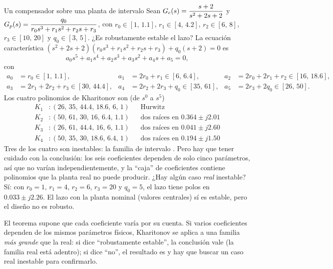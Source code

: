 \begin{ejemplo}[label=ej:es-khar1]{Un compensador sobre una planta de intervalo}
Sean $G_c(s)=\dfrac{s+2}{s^2+2s+2}$ y $G_p(s)=\dfrac{q_0}{r_0s^3+r_1s^2+r_2s+r_3}$, con $r_0\in[1,\,1.1]$, $r_1\in[4,\,4.2]$, $r_2\in[6,\,8]$, $r_3\in[10,\,20]$ y $q_0\in[3,\,5]$. ¿Es robustamente estable el lazo?
\solucion La ecuación característica $(s^2+2s+2)(r_0s^3+r_1s^2+r_2s+r_3)+q_0(s+2)=0$ es
\[
  a_0s^5+a_1s^4+a_2s^3+a_3s^2+a_4s+a_5=0,
\]
con
\[
\begin{aligned}
  a_0&=r_0\in[1,\,1.1], & a_1&=2r_0+r_1\in[6,\,6.4], & a_2&=2r_0+2r_1+r_2\in[16,\,18.6],\\
  a_3&=2r_1+2r_2+r_3\in[30,\,44.4], & a_4&=2r_2+2r_3+q_0\in[35,\,61], & a_5&=2r_3+2q_0\in[26,\,50].
\end{aligned}
\]
Los cuatro polinomios de Kharitonov son (de $s^0$ a $s^5$)
\[
\begin{aligned}
  K_1&: (26,\,35,\,44.4,\,18.6,\,6,\,1) &&\text{Hurwitz}\\
  K_2&: (50,\,61,\,30,\,16,\,6.4,\,1.1) &&\text{dos raíces en }0.364\pm j2.01\\
  K_3&: (26,\,61,\,44.4,\,16,\,6,\,1.1) &&\text{dos raíces en }0.041\pm j2.60\\
  K_4&: (50,\,35,\,30,\,18.6,\,6.4,\,1) &&\text{dos raíces en }0.194\pm j1.50
\end{aligned}
\]
Tres de los cuatro son inestables: la familia de intervalo . Pero hay que tener cuidado con la conclusión: los seis coeficientes dependen de solo cinco parámetros, así que no varían independientemente, y la ``caja'' de coeficientes contiene polinomios que la planta real no puede producir. ¿Hay algún caso \emph{real} inestable? Sí: con $r_0=1$, $r_1=4$, $r_2=6$, $r_3=20$ y $q_0=5$, el lazo tiene polos en $0.033\pm j2.26$. El lazo con la planta nominal (valores centrales) sí es estable, pero el diseño no es robusto.
\end{ejemplo}

\begin{cuidado}
El teorema supone que cada coeficiente varía por su cuenta. Si varios coeficientes dependen de los mismos parámetros físicos, Kharitonov se aplica a una familia \emph{más grande} que la real: si dice ``robustamente estable'', la conclusión vale (la familia real está adentro); si dice ``no'', el resultado es  y hay que buscar un caso real inestable para confirmarlo.
\end{cuidado}

